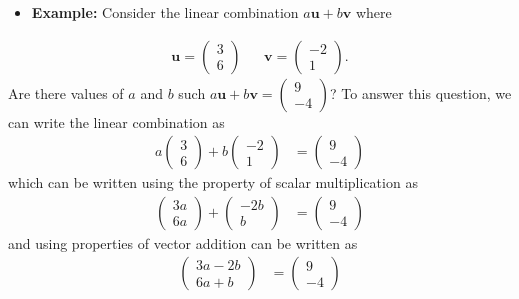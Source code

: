 \documentclass[
]{book}
\providecommand{\tightlist}{%
  \setlength{\itemsep}{0pt}\setlength{\parskip}{0pt}}
\theoremstyle{definition}
\theoremstyle{definition}
\theoremstyle{definition}
\theoremstyle{definition}
\theoremstyle{remark}
\begin{document}
\begin{itemize}
\tightlist
\item
  \textbf{Example:} Consider the linear combination \(a \mathbf{u} + b \mathbf{v}\) where
\end{itemize}

\[
\begin{aligned}
\mathbf{u} = \begin{pmatrix} 3 \\ 6\end{pmatrix} && \mathbf{v} = \begin{pmatrix} -2 \\ 1\end{pmatrix}. \end{aligned}
\]
Are there values of \(a\) and \(b\) such \(a \mathbf{u} + b \mathbf{v} = \begin{pmatrix} 9 \\ - 4 \end{pmatrix}\)? To answer this question, we can write the linear combination as
\[
\begin{aligned}
a \begin{pmatrix} 3 \\ 6\end{pmatrix} + b \begin{pmatrix} -2 \\ 1\end{pmatrix} & = \begin{pmatrix} 9 \\ -4 \end{pmatrix} 
\end{aligned}
\]
which can be written using the property of scalar multiplication as
\[
\begin{aligned}
\begin{pmatrix} 3a \\ 6a \end{pmatrix} + \begin{pmatrix} -2b \\ b \end{pmatrix} & = \begin{pmatrix} 9 \\ -4 \end{pmatrix}
\end{aligned}
\]
and using properties of vector addition can be written as
\[
\begin{aligned}
\begin{pmatrix} 3a - 2b \\ 6a + b \end{pmatrix} & = \begin{pmatrix} 9 \\ -4 \end{pmatrix}
\end{aligned}
\]
\end{document}
